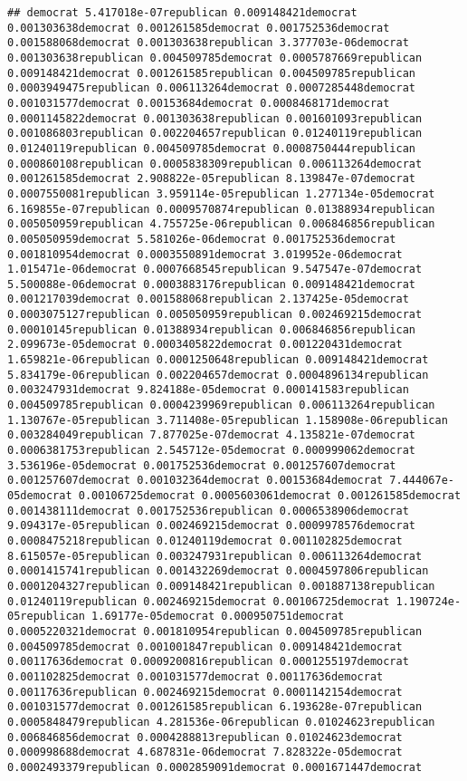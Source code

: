 \documentclass{article}\usepackage[]{graphicx}\usepackage[]{color}
\makeatletter
\newenvironment{kframe}{%
 \def\at@end@of@kframe{}%
 \ifinner\ifhmode%
  \def\at@end@of@kframe{\end{minipage}}%
  \begin{minipage}{\columnwidth}%
 \fi\fi%
 \def\FrameCommand##1{\hskip\@totalleftmargin \hskip-\fboxsep
 \colorbox{shadecolor}{##1}\hskip-\fboxsep
     \hskip-\linewidth \hskip-\@totalleftmargin \hskip\columnwidth}%
 \MakeFramed {\advance\hsize-\width
   \@totalleftmargin\z@ \linewidth\hsize
   \@setminipage}}%
 {\par\unskip\endMakeFramed%
 \at@end@of@kframe}
\newenvironment{knitrout}{}{} %
\makeatother
\begin{document}
\begin{enumerate}
\begin{knitrout}
\begin{kframe}
\begin{verbatim}
## democrat 5.417018e-07republican 0.009148421democrat 0.001303638democrat 0.001261585democrat 0.001752536democrat 0.001588068democrat 0.001303638republican 3.377703e-06democrat 0.001303638republican 0.004509785democrat 0.0005787669republican 0.009148421democrat 0.001261585republican 0.004509785republican 0.0003949475republican 0.006113264democrat 0.0007285448democrat 0.001031577democrat 0.00153684democrat 0.0008468171democrat 0.0001145822democrat 0.001303638republican 0.001601093republican 0.001086803republican 0.002204657republican 0.01240119republican 0.01240119republican 0.004509785democrat 0.0008750444republican 0.000860108republican 0.0005838309republican 0.006113264democrat 0.001261585democrat 2.908822e-05republican 8.139847e-07democrat 0.0007550081republican 3.959114e-05republican 1.277134e-05democrat 6.169855e-07republican 0.0009570874republican 0.01388934republican 0.005050959republican 4.755725e-06republican 0.006846856republican 0.005050959democrat 5.581026e-06democrat 0.001752536democrat 0.001810954democrat 0.0003550891democrat 3.019952e-06democrat 1.015471e-06democrat 0.0007668545republican 9.547547e-07democrat 5.500088e-06democrat 0.0003883176republican 0.009148421democrat 0.001217039democrat 0.001588068republican 2.137425e-05democrat 0.0003075127republican 0.005050959republican 0.002469215democrat 0.00010145republican 0.01388934republican 0.006846856republican 2.099673e-05democrat 0.0003405822democrat 0.001220431democrat 1.659821e-06republican 0.0001250648republican 0.009148421democrat 5.834179e-06republican 0.002204657democrat 0.0004896134republican 0.003247931democrat 9.824188e-05democrat 0.000141583republican 0.004509785republican 0.0004239969republican 0.006113264republican 1.130767e-05republican 3.711408e-05republican 1.158908e-06republican 0.003284049republican 7.877025e-07democrat 4.135821e-07democrat 0.0006381753republican 2.545712e-05democrat 0.000999062democrat 3.536196e-05democrat 0.001752536democrat 0.001257607democrat 0.001257607democrat 0.001032364democrat 0.00153684democrat 7.444067e-05democrat 0.00106725democrat 0.0005603061democrat 0.001261585democrat 0.001438111democrat 0.001752536republican 0.0006538906democrat 9.094317e-05republican 0.002469215democrat 0.0009978576democrat 0.0008475218republican 0.01240119democrat 0.001102825democrat 8.615057e-05republican 0.003247931republican 0.006113264democrat 0.0001415741republican 0.001432269democrat 0.0004597806republican 0.0001204327republican 0.009148421republican 0.001887138republican 0.01240119republican 0.002469215democrat 0.00106725democrat 1.190724e-05republican 1.69177e-05democrat 0.000950751democrat 0.0005220321democrat 0.001810954republican 0.004509785republican 0.004509785democrat 0.001001847republican 0.009148421democrat 0.00117636democrat 0.0009200816republican 0.0001255197democrat 0.001102825democrat 0.001031577democrat 0.00117636democrat 0.00117636republican 0.002469215democrat 0.0001142154democrat 0.001031577democrat 0.001261585republican 6.193628e-07republican 0.0005848479republican 4.281536e-06republican 0.01024623republican 0.006846856democrat 0.0004288813republican 0.01024623democrat 0.000998688democrat 4.687831e-06democrat 7.828322e-05democrat 0.0002493379republican 0.0002859091democrat 0.0001671447democrat 
\end{verbatim}
\end{kframe}
\end{knitrout}
\end{enumerate}
\end{document}
